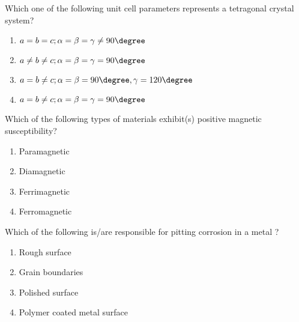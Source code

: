 \item Which one of the following unit cell parameters represents a tetragonal crystal
system? 
\begin{multicols}{2}
\begin{enumerate}
\item $a = b = c ; \alpha=  \beta=  \gamma\neq  90\degree $
\item $a \neq b \neq c ; \alpha=  \beta=  \gamma=  90\degree $
\item $a = b \neq c ; \alpha=  \beta=90\degree,  \gamma=  120\degree $
\item $a = b \neq c ; \alpha=  \beta=  \gamma=  90\degree $
\end{enumerate}
\end{multicols}

\item Which of the following types of materials exhibit(s) positive magnetic
susceptibility? 
\begin{multicols}{4}
\begin{enumerate}
\item Paramagnetic 
\item Diamagnetic 
\item Ferrimagnetic
\item Ferromagnetic
\end{enumerate}
\end{multicols}

\item Which of the following is/are responsible for pitting corrosion in a metal ?
\begin{multicols}{2}
\begin{enumerate}
\item Rough surface
\item Grain boundaries 
\item Polished surface 
\item Polymer coated metal surface
\end{enumerate}
\end{multicols}

